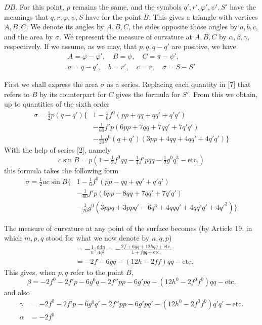 %
\(DB\). For this point, \(p\) remains the same, and the symbols \(q',r',\varphi',\psi',S'\) have the meanings that \(q,r,\varphi,\psi,S\) have for the point \(B\). This gives a triangle with vertices \(A,B,C\). We denote its angles by \(A,B,C\), the sides opposite those angles by \(a,b,c\), and the area by \(\sigma\). We represent the measure of curvature at \(A,B,C\) by \(\alpha,\beta,\gamma\), respectively. If we assume, as we may, that \(p,q,q-q'\) are positive, we have
\[
\begin{gathered}
A=\varphi-\varphi',\quad B=\psi,\quad C=\pi-\psi',\\
a=q-q',\quad b=r',\quad c=r,\quad\sigma=S-S'
\end{gathered}
\]

First we shall express the area \(\sigma\) as a series. Replacing each quantity in [7] that refers to \(B\) by its counterpart for \(C\) gives the formula for \(S'\). From this we obtain, up to quantities of the sixth order
\[
\begin{aligned}
\sigma=\tfrac{1}{2}p(q-q')\{&1-\tfrac{1}{6}f^0(pp+qq+qq'+q'q')\\
&-\tfrac{1}{60}f'p(6pp+7qq+7qq'+7q'q')\\
&-\tfrac{1}{20}g^0(q+q')(3pp+4qq+4qq'+4q'q')\}
\end{aligned}
\]
With the help of series [2], namely
\[
c\sin B=p(1-\tfrac{1}{3}f^0qq-\tfrac{1}{4}f'pqq-\tfrac{1}{2}g^0q^3-\text{etc.})
\]
this formula takes the following form
\[
\begin{aligned}
\sigma=\tfrac{1}{2}ac\sin B\{&1-\tfrac{1}{6}f^0(pp-qq+qq'+q'q')\\
&-\tfrac{1}{60}f'p(6pp-8qq+7qq'+7q'q')\\
&-\tfrac{1}{20}g^0(3ppq+3ppq'-6q^3+4qqq'+4qq'q'+4q'^3)\}
\end{aligned}
\]

The measure of curvature at any point of the surface becomes (by Article 19, in which \(m,p,q\) stood for what we now denote by \(n,q,p\))
\[
\begin{aligned}
&=-\frac{1}{n}\mathord{.}\frac{\mathrm{d}\mathrm{d}n}{\mathrm{d}q^2}=-\frac{2f+6gq+12hqq+\text{etc.}}{1+fqq+\text{etc.}}\\
&=-2f-6gq-(12h-2ff)qq-\text{etc.}
\end{aligned}
\]
This gives, when \(p,q\) refer to the point \(B\),
\[
\beta=-2f^0-2f'p-6g^0q-2f''pp-6g'pq-(12h^0-2f^0f^0)qq-\text{etc.}
\]
and also
\[
\begin{aligned}
\gamma&=-2f^0-2f'p-6g^0q'-2f''pp-6g'pq'-(12h^0-2f^0f^0)q'q'-\text{etc.}\\
\alpha&=-2f^0
\end{aligned}
\]
